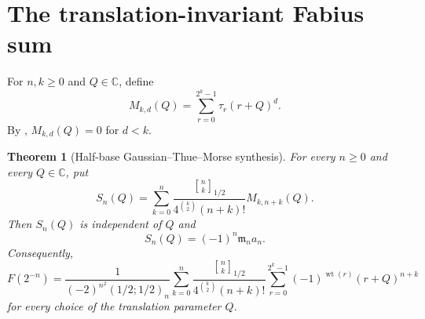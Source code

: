 \documentclass[11pt,oneside,openany]{book}
\newtheorem{theorem}{Theorem}[chapter]
\theoremstyle{definition}
\theoremstyle{remark}
\newcommand{\Qbinom}[3]{\genfrac{[}{]}{0pt}{}{#1}{#2}_{#3}}
\newcommand{\C}{\mathbb C}
\newcommand{\wt}{\operatorname{wt}}
\begin{document}
\section{The translation-invariant Fabius sum}

For $n,k\ge0$ and $Q\in\C$, define
\begin{equation}
 M_{k,d}(Q)=\sum_{r=0}^{2^k-1}\tau_r(r+Q)^d.\label{eq:thue-morse-power-sum}
\end{equation}
By , $M_{k,d}(Q)=0$ for $d<k$.

\begin{theorem}[Half-base Gaussian--Thue--Morse synthesis]\label{thm:fabius-q-synthesis}
For every $n\ge0$ and every $Q\in\C$, put
\begin{equation}
 S_n(Q)=\sum_{k=0}^n
 \frac{\Qbinom nk{1/2}}
 {4^{\binom k2}(n+k)!}
 M_{k,n+k}(Q).\label{eq:fabius-Sn}
\end{equation}
Then $S_n(Q)$ is independent of $Q$ and
\begin{equation}
 S_n(Q)=(-1)^n\mathfrak m_na_n.\label{eq:fabius-Sn-value}
\end{equation}
Consequently,
\begin{equation}
 \boxed{
 F(2^{-n})=
 \frac1{(-2)^{n^2}(1/2;1/2)_n}
 \sum_{k=0}^n
 \frac{\Qbinom nk{1/2}}
 {4^{\binom k2}(n+k)!}
 \sum_{r=0}^{2^k-1}(-1)^{\wt(r)}(r+Q)^{n+k}}\label{eq:fabius-q-formula}
\end{equation}
for every choice of the translation parameter $Q$.
\end{theorem}
\end{document}
